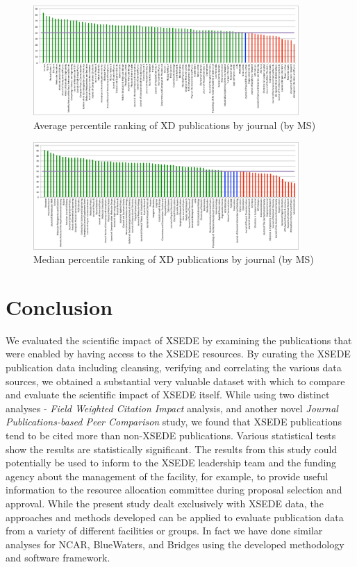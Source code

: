 \documentclass[sigconf]{acmart}
\begin{document}
\begin{figure}[htb!]
  \centering
    \includegraphics[width=0.9\textwidth]{images/ms_peers_byj_mean_10.pdf}
    \caption{Average percentile ranking of XD publications by journal (by MS)}
    \label{F:ms_peers_byj_mean}
\end{figure}

\begin{figure}[htb!]
  \centering
    \includegraphics[width=0.9\textwidth]{images/ms_peers_byj_median_10.pdf}
    \caption{Median percentile ranking of XD publications by journal (by MS)}
    \label{F:ms_peers_byj_median}
\end{figure}

\section{Conclusion} \label{S:conclusion}

We evaluated the scientific impact of XSEDE by examining the
publications that were enabled by having access to the XSEDE
resources. By curating the XSEDE publication data including cleansing,
verifying and correlating the various data sources, we obtained a
substantial very valuable dataset with which to compare and evaluate
the scientific impact of XSEDE itself.  While using two distinct
analyses - \emph{Field Weighted Citation Impact} analysis, and another novel
\emph{Journal Publications-based Peer Comparison} study, we found that XSEDE
publications tend to be cited more than non-XSEDE publications.
Various statistical tests show the results are statistically
significant.  The results from this study could potentially be used to
inform to the XSEDE leadership team and the funding agency about the
management of the facility, for example, to provide useful information
to the resource allocation committee during proposal selection and
approval.  While the present study dealt exclusively with XSEDE data,
the approaches and methods developed can be applied to evaluate
publication data from a variety of different facilities or groups.  In
fact we have done similar analyses for NCAR, BlueWaters, and Bridges
using the developed methodology and software framework.
\end{document}

